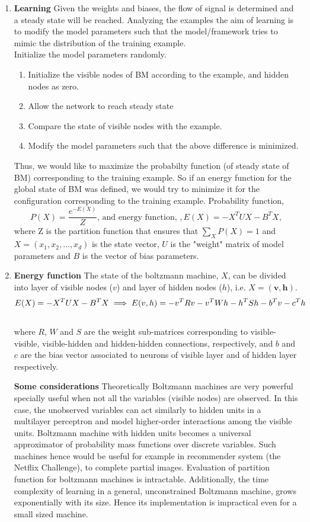 \documentclass[letterpaper,10pt,english]{article}
\begin{document}
\begin{enumerate}
	\item \textbf{Learning} Given the weights and biases, the flow of signal is determined and a steady state will be reached. Analyzing the examples the aim of learning is to modify the model parameters such that the model/framework tries to mimic the distribution of the training example.\\
	Initialize the model parameters randomly.
	\begin{enumerate}
		\item Initialize the visible nodes of BM according to the example, and hidden nodes as zero.
		\item Allow the network to reach steady state
		\item Compare the state of visible nodes with the example.
		\item Modify the model parameters such that the above difference is minimized.
	\end{enumerate}
	Thus, we would like to maximize the probabilty function (of steady state of BM) corresponding to the training example. So if an energy function for the global state of BM was defined, we would try to minimize it for the configuration corresponding to the training example.
	Probability function, $$P(X)=\frac {e^{-E(X)}}{Z} \text{, and energy function, } , E(X)=-X^TUX-B^TX,$$ where Z is the partition function that ensures that $\sum_XP(X)=1$ and $X = (x_{1}, x_{2}, \ldots, x_{d})$ is the state vector, $U$ is the "weight" matrix of model parameters and $B$ is the vector of bias parameters.\\
	\item \textbf{Energy function} 
	The state of the boltzmann machine, \textbf{$X$}, can be divided into layer of visible nodes (\textbf{$v$}) and layer of hidden nodes (\textbf{$h$}), i.e. $\textbf{$X$} = (\textbf{v}, \textbf{h})$.\\
	$$ E(X)=-X^TUX-B^TX \\
	\implies E(v,h)=-v^TRv-v^TWh-h^TSh-b^Tv-c^Th$$\\
	where $R$, $W$ and $S$ are the weight sub-matrices corresponding to visible-visible, visible-hidden and hidden-hidden connections, respectively, and $b$ and $c$ are the bias vector associated to neurons of visible layer and of hidden layer respectively.
	
	\textbf{Some considerations}
	Theoretically Boltzmann machines are very powerful specially useful when not all the variables (visible nodes) are observed. In this case, the unobserved variables can act similarly to hidden units in a multilayer perceptron and model higher-order interactions among the visible units. Boltzmann machine with hidden units becomes a universal approximator of probability mass functions over discrete variables. Such machines hence would be useful for example in recommender system (the Netflix Challenge), to complete partial images.
	Evaluation of partition function for boltzmann machines is intractable. Additionally, the time complexity of learning in a general, unconstrained Boltzmann machine, grows exponentially with its size. Hence its implementation is  impractical even for a small sized machine.
	

\end{enumerate}
\end{document}
